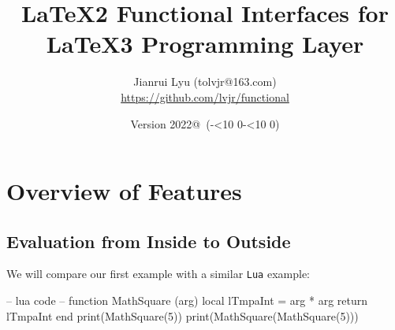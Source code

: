 \documentclass[oneside]{book}
\makeatletter
\newcommand*{\myversion}{2022@}
\newcommand*{\mydate}{Version \myversion\ (\the\year-\mylpad\month-\mylpad\day)}
\newcommand*{\mylpad}[1]{\ifnum#1<10 0\the#1\else\the#1\fi}
\makeatother
\begin{document}
\title{\sffamily LaTeX2 \textcolor{green3}{Functional} Interfaces for LaTeX3 Programming Layer}
\author{Jianrui Lyu (tolvjr@163.com)\\\url{https://github.com/lvjr/functional}}
\date{\mydate\vspace{1cm}\\\myabstract\vspace{10cm}}

\newcommand\myabstract{\parbox{\linewidth}{\hrule\vspace{0.8em}\large
LaTeX3 programming layer (\textsf{expl3}) is very powerful for advanced users,
but it is a little complicated for normal users.
This \textcolor{green3}{\sffamily functional} package aims to provide
intuitive LaTeX2 functional interfaces for it.
\par\vspace{0.5em}
Although there are functions in LaTeX3, the evaluation of them is from outside to inside.
With this package, the evaluation of functions is from inside to outside,
which is the same as other programming languages such as \texttt{JavaScript} or \texttt{Lua}.
In this way, it is rather easy to debug code too.
\par\vspace{0.5em}
Note that many paragraphs in this manual are copied from the documentation of \textsf{expl3}.
\par\vspace{0.8em}\hrule}}

{\let\newpage\relax\vspace{-4cm}\maketitle}

\tableofcontents

\chapter{Overview of Features}

\section{Evaluation from Inside to Outside}

We will compare our first example with a similar \verb!Lua! example:

\begin{code}
-- lua code --
function MathSquare (arg)
  local lTmpaInt = arg * arg
  return lTmpaInt
end
print(MathSquare(5))
print(MathSquare(MathSquare(5)))
\end{code}
\end{document}

